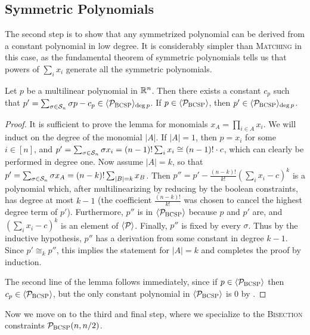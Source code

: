 \subsection{Symmetric Polynomials}
The second step is to show that any symmetrized polynomial can be derived from a constant polynomial in low degree. It is considerably simpler than \textsc{Matching} in this case, as the fundamental theorem of symmetric polynomials tells us that powers of $\sum_i x_i$ generate all the symmetric polynomials. 
\begin{lemma}\label{lem:bcsp-symmetric}
Let $p$ be a multilinear polynomial in $\mathbb R^n$. Then there exists a constant $c_p$ such that $p' = \sum_{\sigma \in \mathcal S_n} \sigma p - c_p \in \langle \mathcal P_{\textsc{BCSP}} \rangle_{\deg p}$. If $p \in \langle \mathcal P_{\textsc{BCSP}} \rangle$, then $p' \in \langle \mathcal P_{\textsc{BCSP}} \rangle_{\deg p}$.
\end{lemma}
\begin{proof}
It is sufficient to prove the lemma for monomials $x_A = \prod_{i \in A} x_i$. We will induct on the degree of the monomial $|A|$. 
If $|A| = 1$, then $p = x_i$ for some $i \in [n]$, and $p' = \sum_{\sigma \in \mathcal S_n} \sigma x_i = (n-1)!\sum_i x_i \cong (n-1)!\cdot c$, which can clearly be performed in degree one. Now assume $|A| = k$, so that $p' = \sum_{\sigma \in \mathcal S_n} \sigma x_A = (n-k)! \sum_{|B|=k} x_B$. Then $p'' = p' - \frac{(n-k)!}{k!}\left(\sum_i x_i - c\right)^k$ is a polynomial which, after multilinearizing by reducing by the boolean constraints, has degree at most $k-1$ (the coefficient $\frac{(n-k)!}{k!}$ was chosen to cancel the highest degree term of $p'$). Furthermore, $p''$ is in $\langle \mathcal P_{\textsc{BCSP}} \rangle$ because $p$ and $p'$ are, and $(\sum_i x_i - c)^k$ is an element of $\langle \mathcal P \rangle$. Finally, $p''$ is fixed by every $\sigma$. Thus by the inductive hypothesis, $p''$ has a derivation from some constant in degree $k-1$. Since $p' \cong_k p''$, this implies the statement for $|A| = k$ and completes the proof by induction.

The second line of the lemma follows immediately, since if $p \in \langle \mathcal P_{\textsc{BCSP}} \rangle$ then $c_p \in \langle \mathcal P_{\textsc{BCSP}} \rangle$, but the only constant polynomial in $\langle \mathcal P_{\textsc{BCSP}} \rangle$ is $0$ by .
\end{proof}
Now we move on to the third and final step, where we specialize to the \textsc{Bisection} constraints $\mathcal P_{\textsc{BCSP}}(n,n/2)$.

